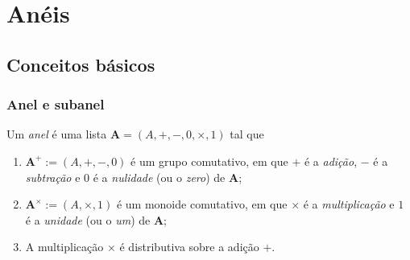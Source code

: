 \chapter{Anéis}

\section{Conceitos básicos}

\subsection{Anel e subanel}

\begin{definition}
Um \emph{anel} é uma lista $\bm A=(A,+,-,0,\times,1)$ tal que
	\begin{enumerate}
	\item $\bm A^+ := (A,+,-,0)$ é um grupo comutativo, em que $+$ é a \emph{adição}, $-$ é a \emph{subtração} e $0$ é a \emph{nulidade} (ou o \emph{zero}) de $\bm A$;
	\item $\bm A^\times := (A,\times,1)$ é um monoide comutativo, em que $\times$ é a \emph{multiplicação} e $1$ é a \emph{unidade} (ou o \emph{um}) de $\bm A$;
	\item A multiplicação $\times$ é distributiva sobre a adição $+$.
	\end{enumerate}
\end{definition}

